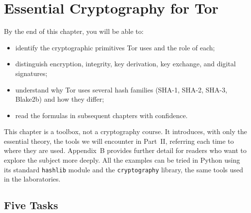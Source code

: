 \chapter{Essential Cryptography for Tor}\label{cap:05-crittografia}

\begin{obiettivi}
By the end of this chapter, you will be able to:
\begin{itemize}[nosep]
  \item identify the cryptographic primitives Tor uses and the role of each;
  \item distinguish encryption, integrity, key derivation, key exchange, and digital signatures;
  \item understand why Tor uses several hash families (SHA-1, SHA-2, SHA-3, Blake2b) and how they differ;
  \item read the formulas in subsequent chapters with confidence.
\end{itemize}
\end{obiettivi}

This chapter is a toolbox, not a cryptography course. It introduces, with only the essential theory, the tools we will encounter in Part~II, referring each time to where they are used. Appendix~B provides further detail for readers who want to explore the subject more deeply. All the examples can be tried in Python using its standard \texttt{hashlib} module and the \texttt{cryptography} library, the same tools used in the laboratories.

\section{Five Tasks}\label{sec:cripto-compiti}

